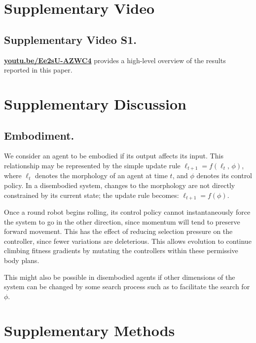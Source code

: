 
\section{Supplementary Video}
\subsection{Supplementary Video S1.}
\label{video}
\href{https://youtu.be/Ee2sU-AZWC4}{\textbf{youtu.be/Ee2sU-AZWC4}}
provides a high-level overview of the results reported in this paper.





\section{Supplementary Discussion}
\label{sec:supplementary-discussion}



\subsection{Embodiment.}

We consider an agent to be embodied if its output affects its input.
This relationship may be represented by the simple update rule $\ell_{t+1} = f(\ell_t,\, \phi)$,
where $\ell_t$ denotes the morphology of an agent at time $t$, and $\phi$ denotes its control policy.
In a disembodied system, changes to the morphology are not directly constrained by its current state; the update rule becomes: $\ell_{t+1} = f(\phi)$.

Once a round robot begins rolling, its control policy cannot instantaneously force the system to go in the other direction, since
momentum will tend to preserve forward movement.
This has the effect of reducing selection pressure on the controller, since fewer variations are deleterious.
This allows evolution to continue climbing fitness gradients by mutating the controllers within these permissive body plans.

This might also be possible in disembodied agents if other dimensions of the system can be changed by some search process such as to facilitate the search for $\phi$.



\section{Supplementary Methods}
\label{sec:supplementary-methods}

